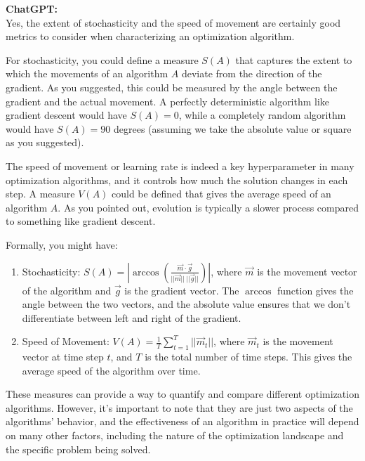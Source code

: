 \documentclass{article}[10pt]
\begin{document}
\noindent \textbf{ChatGPT:}\\
Yes, the extent of stochasticity and the speed of movement are certainly good metrics to consider when characterizing an optimization algorithm.\par

For stochasticity, you could define a measure \( S(A) \) that captures the extent to which the movements of an algorithm \( A \) deviate from the direction of the gradient. 
As you suggested, this could be measured by the angle between the gradient and the actual movement. 
A perfectly deterministic algorithm like gradient descent would have \( S(A) = 0 \), while a completely random algorithm would have \( S(A) = 90 \) degrees (assuming we take the absolute value or square as you suggested).\par

The speed of movement or learning rate is indeed a key hyperparameter in many optimization algorithms, and it controls how much the solution changes in each step. 
A measure \( V(A) \) could be defined that gives the average speed of an algorithm \( A \). 
As you pointed out, evolution is typically a slower process compared to something like gradient descent.\par

Formally, you might have:
\begin{enumerate}
    \item Stochasticity: \( S(A) = |\arccos(\frac{\vec{m} \cdot \vec{g}}{||\vec{m}|| \ ||\vec{g}||})| \), where \( \vec{m} \) is the movement vector of the algorithm and \( \vec{g} \) is the gradient vector. 
    The \( \arccos \) function gives the angle between the two vectors, and the absolute value ensures that we don't differentiate between left and right of the gradient.
    \item Speed of Movement: \( V(A) = \frac{1}{T}\sum_{t=1}^{T} ||\vec{m}_t|| \), where \( \vec{m}_t \) is the movement vector at time step \( t \), and \( T \) is the total number of time steps. 
    This gives the average speed of the algorithm over time.
\end{enumerate}

These measures can provide a way to quantify and compare different optimization algorithms. 
However, it's important to note that they are just two aspects of the algorithms' behavior, and the effectiveness of an algorithm in practice will depend on many other factors, including the nature of the optimization landscape and the specific problem being solved.\par
\end{document}
